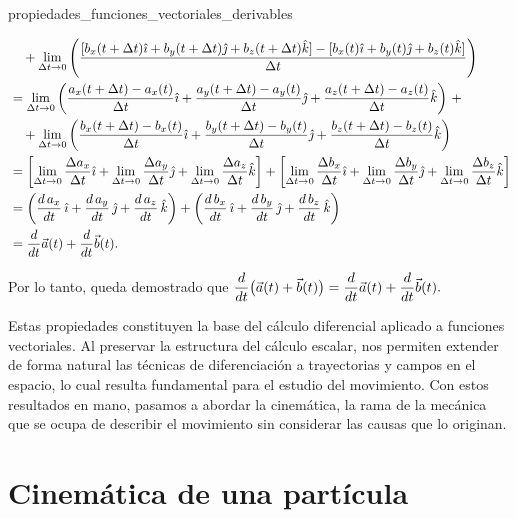 \begin{theorem}{}{propiedades_funciones_vectoriales_derivables}
\begin{demo}
\begin{enumerate}[label=\textit{\roman*)}]
\begin{fullwidth}[      width=\dimexpr\textwidth-\marginparsep-2cm\relax,%
                                  outermargin=\dimexpr-2cm-\marginparsep\relax]
\begin{align*}
                        & \quad + \lim_{\Delta t \to 0} \left(\frac{[b_x(t + \Delta t)\hat{\imath} + b_y(t + \Delta t)\hat{\jmath} + b_z(t + \Delta t)\hat{k}] - [b_x(t)\hat{\imath} + b_y(t)\hat{\jmath} + b_z(t)\hat{k}]}{\Delta t}\right) \\
                        & = \lim_{\Delta t \to 0} \left(\frac{a_x(t + \Delta t) - a_x(t)}{\Delta t}\hat{\imath} + \frac{a_y(t + \Delta t) - a_y(t)}{\Delta t}\hat{\jmath} + \frac{a_z(t + \Delta t) - a_z(t)}{\Delta t}\hat{k}\right) \, + \\
                        & \quad + \lim_{\Delta t \to 0} \left(\frac{b_x(t + \Delta t) - b_x(t)}{\Delta t}\hat{\imath} + \frac{b_y(t + \Delta t) - b_y(t)}{\Delta t}\hat{\jmath} + \frac{b_z(t + \Delta t) - b_z(t)}{\Delta t}\hat{k}\right) \\
                        & = \left[\lim_{\Delta t \to 0} \frac{\Delta a_x}{\Delta t}\hat{\imath} + \lim_{\Delta t \to 0} \frac{\Delta a_y}{\Delta t}\hat{\jmath} + \lim_{\Delta t \to 0} \frac{\Delta a_z}{\Delta t}\hat{k}\right] + \left[\lim_{\Delta t \to 0} \frac{\Delta b_x}{\Delta t}\hat{\imath} + \lim_{\Delta t \to 0} \frac{\Delta b_y}{\Delta t}\hat{\jmath} + \lim_{\Delta t \to 0} \frac{\Delta b_z}{\Delta t}\hat{k}\right] \\
                        & = \left(\frac{d\,a_x}{dt}\,\hat{\imath} + \frac{d\,a_y}{dt}\,\hat{\jmath} + \frac{d\,a_z}{dt}\,\hat{k}\right) + \left(\frac{d\,b_x}{dt}\,\hat{\imath} + \frac{d\,b_y}{dt}\,\hat{\jmath} + \frac{d\,b_z}{dt}\,\hat{k}\right) \\
                        & = \frac{d}{dt}\vec{a}(t) + \frac{d}{dt}\vec{b}(t).
                    \end{align*}
                \end{fullwidth}
        \end{enumerate}
        Por lo tanto, queda demostrado que $\dfrac{d}{dt} \bigl(\vec{a}(t) + \vec{b}(t)\bigr) = \dfrac{d}{dt}\vec{a}(t) + \dfrac{d}{dt}\vec{b}(t).$
    \end{demo}
\end{theorem}

Estas propiedades constituyen la base del cálculo diferencial aplicado a funciones vectoriales. Al preservar la estructura del cálculo escalar, nos permiten extender de forma natural las técnicas de diferenciación a trayectorias y campos en el espacio, lo cual resulta fundamental para el estudio del movimiento. Con estos resultados en mano, pasamos a abordar la cinemática, la rama de la mecánica que se ocupa de describir el movimiento sin considerar las causas que lo originan.

\section{Cinemática de una partícula}


